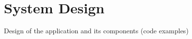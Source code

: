\chapter{System Design} %

\label{ch:systemdesign} %
Design of the application and its components (code examples)
